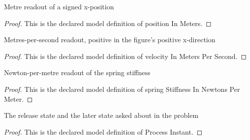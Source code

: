 \begin{definition}
  \label{def:physics:phyx-mini-0813:phyxminiproblems-problemphyxmini0813-positioninmeters}
  Metre readout of a signed x-position
\end{definition}
\begin{proof}
  This is the declared model definition of position In Meters.
\end{proof}
\begin{definition}
  \label{def:physics:phyx-mini-0813:phyxminiproblems-problemphyxmini0813-velocityinmeterspersecond}
  Metres-per-second readout, positive in the figure's positive x-direction
\end{definition}
\begin{proof}
  This is the declared model definition of velocity In Meters Per Second.
\end{proof}
\begin{definition}
  \label{def:physics:phyx-mini-0813:phyxminiproblems-problemphyxmini0813-springstiffnessinnewtonspermeter}
  Newton-per-metre readout of the spring stiffness
\end{definition}
\begin{proof}
  This is the declared model definition of spring Stiffness In Newtons Per Meter.
\end{proof}
\begin{definition}
  \label{def:physics:phyx-mini-0813:phyxminiproblems-problemphyxmini0813-processinstant}
  The release state and the later state asked about in the problem
\end{definition}
\begin{proof}
  This is the declared model definition of Process Instant.
\end{proof}
